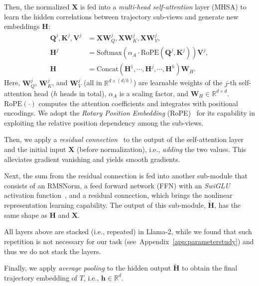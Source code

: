 Then, the normalized $\mathbf{X}$ is fed into a \emph{multi-head self-attention} layer (MHSA) to learn the hidden correlations between trajectory sub-views and generate new embeddings $\mathbf{H}$: 
{\small
\begin{equation}\label{eq:selfattention}
\begin{split}
    \mathbf{Q}^{j}, \mathbf{K}^{j}, \mathbf{V}^{j} & = \mathbf{X}\mathbf{W}_{Q}^{j}, \mathbf{X}\mathbf{W}_{K}^{j}, \mathbf{X}\mathbf{W}_{V}^{j}, \\
    \mathbf{H}^j & = \mathrm{Softmax} (\alpha_{A} \cdot
    \mathrm{RoPE}(\mathbf{Q}^{j}, \mathbf{K}^{j})) \mathbf{V}^{j}, \\
    \mathbf{H} & = \mathrm{Concat}(\mathbf{H}^{1},\cdots, \mathbf{H}^{j},\cdots, \mathbf{H}^{h})\mathbf{W}_{H}.
\end{split}
\end{equation}
}
Here, $\mathbf{W}_Q^j$, $\mathbf{W}_K^j$, and $\mathbf{W}_V^j$ (all in $\mathbb{R}^{d\times (d/h)}$) are learnable weights of the $j$-th self-attention head ($h$ heads in total), $\alpha_{A}$ is a scaling factor, and $\mathbf{W}_{H} \in \mathbb{R}^{d\times d}$. $\mathrm{RoPE}(\cdot)$ computes the attention coefficients and integrates with positional encodings. We adopt the \emph{Rotary Position Embedding} (RoPE)~\cite{rope} for its capability in exploiting the relative position dependency among the sub-views.  

Then, we apply a \emph{residual connection}~\cite{resnet} to the output of the self-attention layer and the initial input $\mathbf{X}$ (before normalization), i.e., \emph{adding} the two values. This alleviates gradient vanishing and yields smooth gradients. 


Next, the sum from the residual connection is fed into another sub-module that consists of an RMSNorm, a feed forward network (FFN) with an \emph{SwiGLU} activation function~\cite{glu}, and a residual connection, which brings the nonlinear representation learning capability.
The output of this sub-module, $\widetilde{\mathbf{H}}$, has the same shape as $\mathbf{H}$ and $\mathbf{X}$.

All layers above are stacked (i.e., repeated) in Llama-2, while we found that such repetition is not necessary for our task (see~Appendix~\ref{app:parameterstudy}) and thus we do not stack the layers.

Finally, we apply \emph{average pooling} to the hidden output $\widetilde{\mathbf{H}}$ to obtain the final trajectory embedding of $T$, i.e., $\mathbf{h} \in \mathbb{R}^{d}$. 

